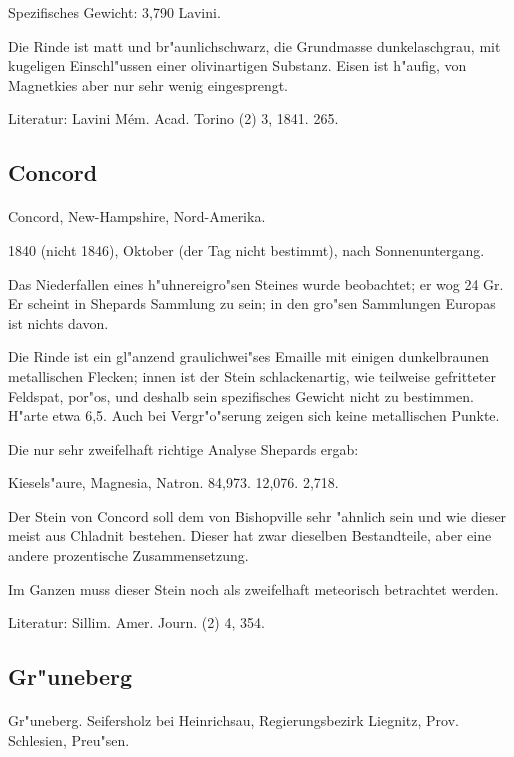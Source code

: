 \documentclass[a4paper, 11pt, oneside]{article}
\begin{document}
Spezifisches Gewicht: 3,790 Lavini.

Die Rinde ist matt und br"aunlichschwarz, die Grundmasse dunkelaschgrau, mit kugeligen Einschl"ussen einer olivinartigen Substanz. Eisen ist h"aufig, von Magnetkies aber nur sehr wenig eingesprengt.

\footnotesize
Literatur: Lavini Mém. Acad. Torino (2) 3, 1841. 265.

\subsection{Concord}
\normalsize
\paragraph{}
Concord, New-Hampshire, Nord-Amerika.

1840 (nicht 1846), Oktober (der Tag nicht bestimmt), nach Sonnenuntergang.

Das Niederfallen eines h"uhnereigro"sen Steines wurde beobachtet; er wog 24 Gr. Er scheint in Shepards Sammlung zu sein; in den gro"sen Sammlungen Europas ist nichts davon.

Die Rinde ist ein gl"anzend graulichwei"ses Emaille mit einigen dunkelbraunen metallischen Flecken; innen ist der Stein schlackenartig, wie teilweise gefritteter Feldspat, por"os, und deshalb sein spezifisches Gewicht nicht zu bestimmen. H"arte etwa 6,5. Auch bei Vergr"o"serung zeigen sich keine metallischen Punkte.

Die nur sehr zweifelhaft richtige Analyse Shepards ergab:

Kiesels"aure, Magnesia, Natron.  
84,973. 12,076. 2,718.

Der Stein von Concord soll dem von Bishopville sehr "ahnlich sein und wie dieser meist aus Chladnit bestehen. Dieser hat zwar dieselben Bestandteile, aber eine andere prozentische Zusammensetzung.

Im Ganzen muss dieser Stein noch als zweifelhaft meteorisch betrachtet werden.

\footnotesize
Literatur: Sillim. Amer. Journ. (2) 4, 354.

\subsection{Gr"uneberg}
\normalsize
\paragraph{}
Gr"uneberg. Seifersholz bei Heinrichsau, Regierungsbezirk Liegnitz, Prov. Schlesien, Preu"sen.
\end{document}
